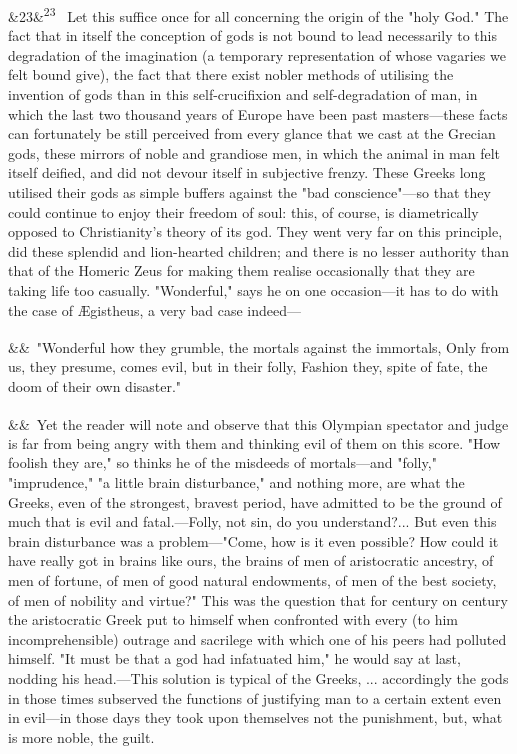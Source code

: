 \documentclass[12pt]{article}
\newcommand{\para}[1][]{\par\noindent\ifx&#1&\else\textsuperscript{\footnotesize #1}~\fi}
\begin{document}
\para[23] Let this suffice once for all concerning the origin of the "holy God." The fact that in itself the conception of gods is not bound to lead necessarily to this degradation of the imagination (a temporary representation of whose vagaries we felt bound give), the fact that there exist nobler methods of utilising the invention of gods than in this self-crucifixion and self-degradation of man, in which the last two thousand years of Europe have been past masters---these facts can fortunately be still perceived from every glance that we cast at the Grecian gods, these mirrors of noble and grandiose men, in which the animal in man felt itself deified, and did not devour itself in subjective frenzy. These Greeks long utilised their gods as simple buffers against the "bad conscience"---so that they could continue to enjoy their freedom of soul: this, of course, is diametrically opposed to Christianity's theory of its god. They went very far on this principle, did these splendid and lion-hearted children; and there is no lesser authority than that of the Homeric Zeus for making them realise occasionally that they are taking life too casually. "Wonderful," says he on one occasion---it has to do with the case of Ægistheus, a very bad case indeed---

\para "Wonderful how they grumble, the mortals against the immortals, Only from us, they presume, comes evil, but in their folly, Fashion they, spite of fate, the doom of their own disaster."

\para Yet the reader will note and observe that this Olympian spectator and judge is far from being angry with them and thinking evil of them on this score. "How foolish they are," so thinks he of the misdeeds of mortals---and "folly," "imprudence," "a little brain disturbance," and nothing more, are what the Greeks, even of the strongest, bravest period, have admitted to be the ground of much that is evil and fatal.---Folly, not sin, do you understand?... But even this brain disturbance was a problem---"Come, how is it even possible? How could it have really got in brains like ours, the brains of men of aristocratic ancestry, of men of fortune, of men of good natural endowments, of men of the best society, of men of nobility and virtue?" This was the question that for century on century the aristocratic Greek put to himself when confronted with every (to him incomprehensible) outrage and sacrilege with which one of his peers had polluted himself. "It must be that a god had infatuated him," he would say at last, nodding his head.---This solution is typical of the Greeks, ... accordingly the gods in those times subserved the functions of justifying man to a certain extent even in evil---in those days they took upon themselves not the punishment, but, what is more noble, the guilt.
\end{document}
